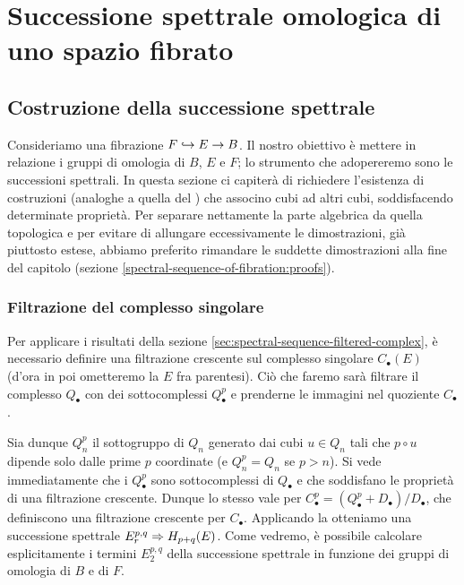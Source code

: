 \chapter{Successione spettrale omologica di uno spazio fibrato}

\section{Costruzione della successione spettrale}
Consideriamo una fibrazione $F\hookrightarrow E\to B$. Il nostro obiettivo è mettere in relazione i gruppi di omologia di $B$, $E$ e $F$; lo strumento che adopereremo sono le successioni spettrali. In questa sezione ci capiterà di richiedere l'esistenza di costruzioni (analoghe a quella del ) che associno cubi ad altri cubi, soddisfacendo determinate proprietà. Per separare nettamente la parte algebrica da quella topologica e per evitare di allungare eccessivamente le dimostrazioni, già piuttosto estese, abbiamo preferito rimandare le suddette dimostrazioni alla fine del capitolo (sezione \ref{spectral-sequence-of-fibration:proofs}).

\subsection{Filtrazione del complesso singolare}
Per applicare i risultati della sezione \ref{sec:spectral-sequence-filtered-complex}, è necessario definire una filtrazione crescente sul complesso singolare $C_\bullet(E)$ (d'ora in poi ometteremo la $E$ fra parentesi). Ciò che faremo sarà filtrare il complesso $Q_\bullet$ con dei sottocomplessi $Q^p_\bullet$ e prenderne le immagini nel quoziente $C_\bullet$.

Sia dunque $Q^p_n$ il sottogruppo di $Q_n$ generato dai cubi $u\in Q_n$ tali che $p\circ u$ dipende solo dalle prime $p$ coordinate (e $Q^p_n=Q_n$ se $p>n$). Si vede immediatamente che i $Q^p_\bullet$ sono sottocomplessi di $Q_\bullet$ e che soddisfano le proprietà di una filtrazione crescente. Dunque lo stesso vale per $C^p_\bullet=(Q^p_\bullet+D_\bullet)/D_\bullet$, che definiscono una filtrazione crescente per $C_\bullet$. Applicando la  otteniamo una successione spettrale $E^{p,q}_r\Rightarrow H_{p+q}(E)$. Come vedremo, è possibile calcolare esplicitamente i termini $E^{p,q}_2$ della successione spettrale in funzione dei gruppi di omologia di $B$ e di $F$.

